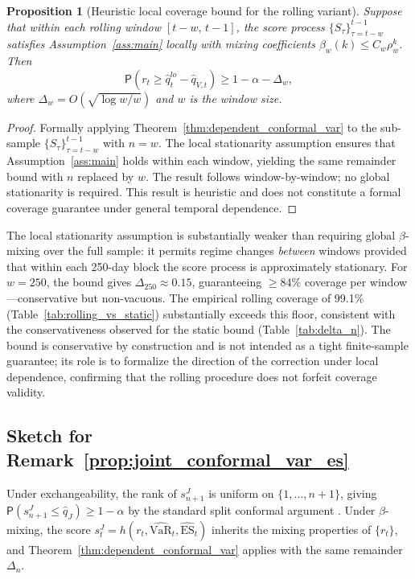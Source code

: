 \documentclass[preprint,11pt,authoryear]{elsarticle}
\newtheorem{proposition}[theorem]{Proposition}
\newcommand{\VaR}{\mathrm{VaR}}
\newcommand{\ES}{\mathrm{ES}}
\renewcommand{\P}{\mathsf{P}}
\newcommand{\1}{\boldsymbol{1}}
\begin{document}
	\begin{proposition}[Heuristic local coverage bound for the rolling variant]
		\label{prop:rolling_coverage}
		Suppose that within each rolling window $[t-w,\, t-1]$, the
		score process $\{S_\tau\}_{\tau=t-w}^{t-1}$ satisfies
		Assumption~\ref{ass:main} locally with mixing coefficients
		$\beta_w(k) \leq C_w \rho_w^k$. Then
		\[
		\P\!\left(r_t \geq \hat{q}_t^{lo} - \hat{q}_{V,t}\right)
		\geq 1 - \alpha - \Delta_w,
		\]
		where $\Delta_w = O(\sqrt{\log w / w})$ and $w$ is the window
		size.
	\end{proposition}

	\begin{proof}
		Formally applying Theorem~\ref{thm:dependent_conformal_var} to the
		sub-sample $\{S_\tau\}_{\tau=t-w}^{t-1}$ with $n = w$. The
		local stationarity assumption ensures that
		Assumption~\ref{ass:main} holds within each window, yielding
		the same remainder bound with $n$ replaced by $w$. The result
		follows window-by-window; no global stationarity is required.
		This result is heuristic and does not constitute a formal coverage guarantee under general temporal dependence.
	\end{proof}

	The local stationarity assumption is substantially weaker than
	requiring global $\beta$-mixing over the full sample: it permits
	regime changes \emph{between} windows provided that within each
	250-day block the score process is approximately stationary.
	For $w = 250$, the bound gives $\Delta_{250} \approx 0.15$,
	guaranteeing $\geq$84\% coverage per window---conservative but
	non-vacuous. The empirical rolling coverage of 99.1\%
	(Table~\ref{tab:rolling_vs_static}) substantially exceeds this
	floor, consistent with the conservativeness observed for the
	static bound (Table~\ref{tab:delta_n}).
	The bound is conservative by construction and is not intended as a tight finite-sample guarantee; its role is to formalize the direction of the correction under local dependence, confirming that the rolling procedure does not forfeit coverage validity.

	\subsection{Sketch for Remark~\ref{prop:joint_conformal_var_es}}
	
	Under exchangeability, the rank of $s_{n+1}^J$ is uniform on $\{1,\ldots,n+1\}$, giving $\P(s_{n+1}^J \le \hat{q}_J) \geq 1 - \alpha$ by the standard split conformal argument \citep{vovk2005algorithmic}. Under $\beta$-mixing, the score $s_t^J = h(r_t, \widehat{\VaR}_t, \widehat{\ES}_t)$ inherits the mixing properties of $\{r_t\}$, and Theorem~\ref{thm:dependent_conformal_var} applies with the same remainder $\Delta_n$.
	
\end{document}

